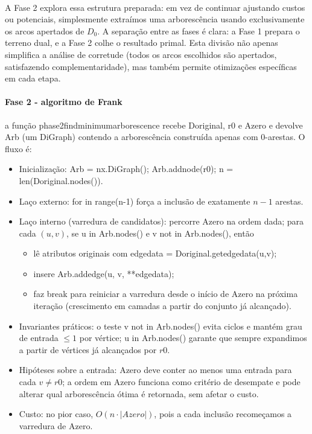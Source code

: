 \documentclass[12pt,a4paper]{article}
\def\texttt#1{#1}%
\def\emph#1{#1}%
\def\_{}%
\begin{document}
\paragraph{}
A Fase 2 explora essa estrutura preparada: em vez de continuar ajustando custos ou potenciais, simplesmente extraímos uma arborescência usando exclusivamente os arcos apertados de \(D_0\). A separação entre as fases é clara: a Fase 1 prepara o terreno dual, e a Fase 2 colhe o resultado primal. Esta divisão não apenas simplifica a análise de corretude (todos os arcos escolhidos são apertados, satisfazendo complementaridade), mas também permite otimizações específicas em cada etapa.

\paragraph{Fase 2 - algoritmo de Frank}
a função \texttt{phase2\_find\_minimum\_arborescence} recebe \texttt{D\_original}, \texttt{r0} e \texttt{A\_zero} e devolve \texttt{Arb} (um \texttt{DiGraph}) contendo a arborescência construída apenas com 0-arestas. O fluxo é:
\begin{itemize}\setlength{\itemsep}{1pt}
    \item \emph{Inicialização:} \texttt{Arb = nx.DiGraph(); Arb.add\_node(r0); n = len(D\_original.nodes())}.
    \item \emph{Laço externo:} \texttt{for \_ in range(n-1)} força a inclusão de exatamente \(n-1\) arestas.
    \item \emph{Laço interno (varredura de candidatos):} percorre \texttt{A\_zero} na ordem dada; para cada \((u,v)\), se \texttt{u in Arb.nodes()} e \texttt{v not in Arb.nodes()}, então
          \begin{itemize}\setlength{\itemsep}{1pt}
              \item lê atributos originais com \texttt{edge\_data = D\_original.get\_edge\_data(u,v)};
              \item insere \texttt{Arb.add\_edge(u, v, **edge\_data)};
              \item faz \texttt{break} para reiniciar a varredura desde o início de \texttt{A\_zero} na próxima iteração (crescimento em camadas a partir do conjunto já alcançado).
          \end{itemize}
    \item \emph{Invariantes práticos:} o teste \texttt{v not in Arb.nodes()} evita ciclos e mantém grau de entrada \(\le 1\) por vértice; \texttt{u in Arb.nodes()} garante que sempre expandimos a partir de vértices já alcançados por \(r0\).
    \item \emph{Hipóteses sobre a entrada:} \texttt{A\_zero} deve conter ao menos uma entrada para cada \(v\neq r0\); a ordem em \texttt{A\_zero} funciona como critério de desempate e pode alterar qual arborescência ótima é retornada, sem afetar o custo.
    \item \emph{Custo:} no pior caso, \(O(n\cdot |A\_zero|)\), pois a cada inclusão recomeçamos a varredura de \texttt{A\_zero}.
\end{itemize}
\end{document}
